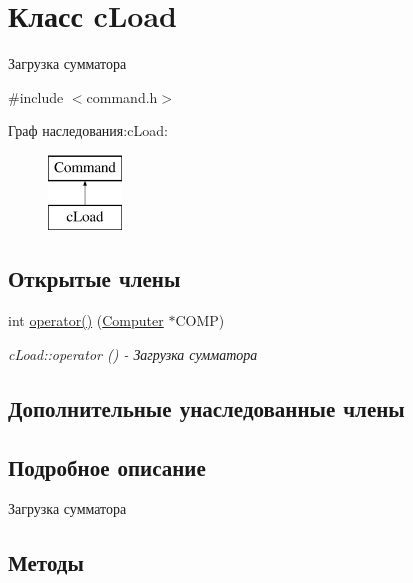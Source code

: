 \hypertarget{classc_load}{}\section{Класс c\+Load}
\label{classc_load}


Загрузка сумматора  




{\ttfamily \#include $<$command.\+h$>$}

Граф наследования\+:c\+Load\+:\begin{figure}[H]
\begin{center}
\leavevmode
\includegraphics[height=2.000000cm]{classc_load}
\end{center}
\end{figure}
\subsection*{Открытые члены}
\begin{DoxyCompactItemize}
\item 
int \hyperlink{classc_load_a5da79e1b1235b32d87e7f3bd8d1bc00b}{operator()} (\hyperlink{class_computer}{Computer} $\ast$C\+O\+MP)
\begin{DoxyCompactList}\small\item\em c\+Load\+::operator () -\/ Загрузка сумматора \end{DoxyCompactList}\end{DoxyCompactItemize}
\subsection*{Дополнительные унаследованные члены}


\subsection{Подробное описание}
Загрузка сумматора 

\subsection{Методы}
\hypertarget{classc_load_a5da79e1b1235b32d87e7f3bd8d1bc00b}{}\label{classc_load_a5da79e1b1235b32d87e7f3bd8d1bc00b} 
